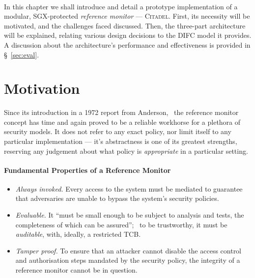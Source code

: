 

\paragraph{} In this chapter we shall introduce and detail a prototype implementation of a modular, SGX-protected \textit{reference monitor} --- \textsc{Citadel}. First, its necessity will be motivated, and the challenges faced discussed. Then, the three-part architecture will be explained, relating various design decisions to the DIFC model it provides. A discussion about the architecture's performance and effectiveness is provided in §~\ref{sec:eval}.

\section{Motivation}
\paragraph{} Since its introduction in a 1972 report from Anderson,~\cite{reference-monitor} the reference monitor concept has time and again proved to be a reliable workhorse for a plethora of security models. It does not refer to any exact policy, nor limit itself to any particular implementation --- it's abstractness is one of its greatest strengths, reserving any judgement about what policy is \textit{appropriate} in a particular setting.~\cite{irvine-rm}

\paragraph{Fundamental Properties of a Reference Monitor}

\begin{itemize}
    \item \textit{Always invoked.} Every access to the system must be mediated to guarantee that adversaries are unable to bypass the system's security policies.
    \item \textit{Evaluable.} It ``must be small enough to be subject to analysis and tests, the completeness of which can be assured'';~\cite{reference-monitor} to be trustworthy, it must be \textit{auditable}, with, ideally, a restricted TCB.
    \item \textit{Tamper proof.} To ensure that an attacker cannot disable the access control and authorisation steps mandated by the security policy, the integrity of a reference monitor cannot be in question.
\end{itemize}

